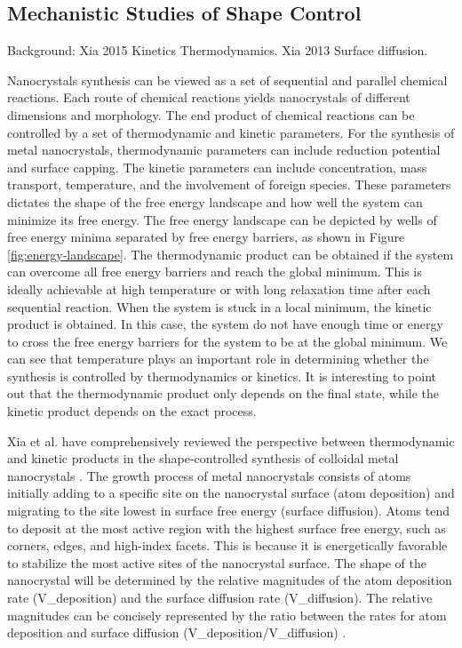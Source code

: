 \subsection{Mechanistic Studies of Shape Control}

Background: Xia 2015 Kinetics Thermodynamics. Xia 2013 Surface diffusion.

Nanocrystals synthesis can be viewed as a set of sequential and parallel chemical reactions.
Each route of chemical reactions yields nanocrystals of different dimensions and morphology.
The end product of chemical reactions can be controlled by a set of thermodynamic and kinetic parameters.
For the synthesis of metal nanocrystals, thermodynamic parameters can include reduction potential and surface capping.
The kinetic parameters can include concentration, mass transport, temperature, and the involvement of foreign species.
These parameters dictates the shape of the free energy landscape and how well the system can minimize its free energy.
The free energy landscape can be depicted by wells of free energy minima separated by free energy barriers, as shown in Figure \ref{fig:energy-landscape}.
The thermodynamic product can be obtained if the system can overcome all free energy barriers and reach the global minimum.
This is ideally achievable at high temperature or with long relaxation time after each sequential reaction.
When the system is stuck in a local minimum, the kinetic product is obtained.
In this case, the system do not have enough time or energy to cross the free energy barriers for the system to be at the global minimum.
We can see that temperature plays an important role in determining whether the synthesis is controlled by thermodynamics or kinetics.
It is interesting to point out that the thermodynamic product only depends on the final state, while the kinetic product depends on the exact process.

Xia et al. have comprehensively reviewed the perspective between thermodynamic and kinetic products in the shape-controlled synthesis of colloidal metal nanocrystals \cite{Xia_2015}.
The growth process of metal nanocrystals consists of atoms initially adding to a specific site on the nanocrystal surface (atom deposition) and migrating to the site lowest in surface free energy (surface diffusion).
Atoms tend to deposit at the most active region with the highest surface free energy, such as corners, edges, and high-index facets.
This is because it is energetically favorable to stabilize the most active sites of the nanocrystal surface.
The shape of the nanocrystal will be determined by the relative magnitudes of the atom deposition rate (V_{deposition}) and the surface diffusion rate (V_{diffusion}).
The relative magnitudes can be concisely represented by the ratio between the rates for atom deposition and surface diffusion (V_{deposition}/V_{diffusion}) \cite{Xia_2013}.

